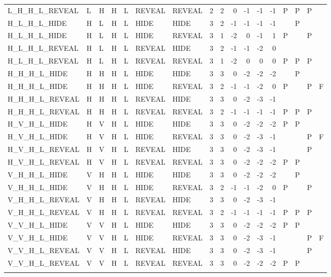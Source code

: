 \begin{longtable}{lllllllrrrrrrllll}
  L\_H\_H\_L\_REVEAL & L & H & H & L & REVEAL & REVEAL & 2 & 2 & 0 & -1 & -1 & -1 & P & P & P &  \\ 
  H\_L\_H\_L\_HIDE & H & L & H & L & HIDE & HIDE & 3 & 2 & -1 & -1 & -1 & -1 &  & P &  &  \\ 
  H\_L\_H\_L\_HIDE & H & L & H & L & HIDE & REVEAL & 3 & 1 & -2 & 0 & -1 & 1 & P &  & P &  \\ 
  H\_L\_H\_L\_REVEAL & H & L & H & L & REVEAL & HIDE & 3 & 2 & -1 & -1 & -2 & 0 &  &  &  &  \\ 
  H\_L\_H\_L\_REVEAL & H & L & H & L & REVEAL & REVEAL & 3 & 1 & -2 & 0 & 0 & 0 & P & P & P &  \\ 
  H\_H\_H\_L\_HIDE & H & H & H & L & HIDE & HIDE & 3 & 3 & 0 & -2 & -2 & -2 &  & P &  &  \\ 
  H\_H\_H\_L\_HIDE & H & H & H & L & HIDE & REVEAL & 3 & 2 & -1 & -1 & -2 & 0 & P &  & P & F \\ 
  H\_H\_H\_L\_REVEAL & H & H & H & L & REVEAL & HIDE & 3 & 3 & 0 & -2 & -3 & -1 &  &  &  &  \\ 
  H\_H\_H\_L\_REVEAL & H & H & H & L & REVEAL & REVEAL & 3 & 2 & -1 & -1 & -1 & -1 & P & P & P &  \\ 
  H\_V\_H\_L\_HIDE & H & V & H & L & HIDE & HIDE & 3 & 3 & 0 & -2 & -2 & -2 & P & P &  &  \\ 
  H\_V\_H\_L\_HIDE & H & V & H & L & HIDE & REVEAL & 3 & 3 & 0 & -2 & -3 & -1 &  &  & P & F \\ 
  H\_V\_H\_L\_REVEAL & H & V & H & L & REVEAL & HIDE & 3 & 3 & 0 & -2 & -3 & -1 &  &  & P &  \\ 
  H\_V\_H\_L\_REVEAL & H & V & H & L & REVEAL & REVEAL & 3 & 3 & 0 & -2 & -2 & -2 & P & P &  &  \\ 
  V\_H\_H\_L\_HIDE & V & H & H & L & HIDE & HIDE & 3 & 3 & 0 & -2 & -2 & -2 &  & P &  &  \\ 
  V\_H\_H\_L\_HIDE & V & H & H & L & HIDE & REVEAL & 3 & 2 & -1 & -1 & -2 & 0 & P &  & P &  \\ 
  V\_H\_H\_L\_REVEAL & V & H & H & L & REVEAL & HIDE & 3 & 3 & 0 & -2 & -3 & -1 &  &  &  &  \\ 
  V\_H\_H\_L\_REVEAL & V & H & H & L & REVEAL & REVEAL & 3 & 2 & -1 & -1 & -1 & -1 & P & P & P &  \\ 
  V\_V\_H\_L\_HIDE & V & V & H & L & HIDE & HIDE & 3 & 3 & 0 & -2 & -2 & -2 & P & P &  &  \\ 
  V\_V\_H\_L\_HIDE & V & V & H & L & HIDE & REVEAL & 3 & 3 & 0 & -2 & -3 & -1 &  &  & P & F \\ 
  V\_V\_H\_L\_REVEAL & V & V & H & L & REVEAL & HIDE & 3 & 3 & 0 & -2 & -3 & -1 &  &  & P &  \\ 
  V\_V\_H\_L\_REVEAL & V & V & H & L & REVEAL & REVEAL & 3 & 3 & 0 & -2 & -2 & -2 & P & P &  &  \\ 
   \hline
\hline
\label{truthtable}
\end{longtable}
\endgroup
